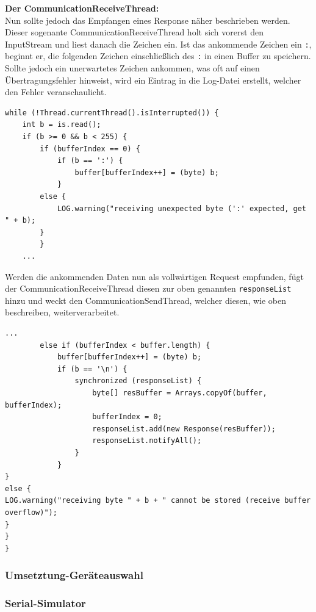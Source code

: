 \textbf{Der CommunicationReceiveThread:}\\
Nun sollte jedoch das Empfangen eines Response näher beschrieben werden.
Dieser sogenante CommunicationReceiveThread holt sich vorerst den InputStream und liest danach die Zeichen ein.
Ist das ankommende Zeichen ein \lstinline[style=java]{:}, beginnt er, die folgenden Zeichen einschließlich des \lstinline[style=java]{:} in einen Buffer zu speichern.
Sollte jedoch ein unerwartetes Zeichen ankommen, was oft auf einen Übertragungsfehler hinweist, wird ein Eintrag in die Log-Datei erstellt, welcher den Fehler veranschaulicht.
\begin{lstlisting}[style=java,caption=Java-Codebeispiel,label=commThreadSend]
while (!Thread.currentThread().isInterrupted()) {
    int b = is.read();
    if (b >= 0 && b < 255) {
        if (bufferIndex == 0) {
            if (b == ':') {
                buffer[bufferIndex++] = (byte) b;
            }
        else {
            LOG.warning("receiving unexpected byte (':' expected, get " + b);
        }
        }
    ...
\end{lstlisting}
Werden die ankommenden Daten nun als vollwärtigen Request empfunden, fügt der CommunicationReceiveThread diesen zur oben genannten \lstinline[style=java]{responseList} hinzu und weckt den CommunicationSendThread, welcher diesen, wie oben beschreiben, weiterverarbeitet.
\begin{lstlisting}[style=java,caption=Java-Codebeispiel,label=commThreadSend]
        ...
        else if (bufferIndex < buffer.length) {
            buffer[bufferIndex++] = (byte) b;
            if (b == '\n') {
                synchronized (responseList) {
                    byte[] resBuffer = Arrays.copyOf(buffer, bufferIndex);
                    bufferIndex = 0;
                    responseList.add(new Response(resBuffer));
                    responseList.notifyAll();
                }
            }
}
else {
LOG.warning("receiving byte " + b + " cannot be stored (receive buffer overflow)");
}
}
}
\end{lstlisting}
\subsubsection{Umsetztung-Geräteauswahl} \label{sssec:deviceSelection}

\subsubsection{Serial-Simulator}
